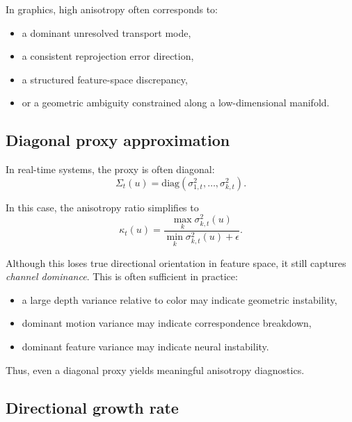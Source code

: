 \documentclass[11pt]{article}
\theoremstyle{definition}
\theoremstyle{plain}
\begin{document}
In graphics, high anisotropy often corresponds to:
\begin{itemize}[leftmargin=1.5em]
    \item a dominant unresolved transport mode,
    \item a consistent reprojection error direction,
    \item a structured feature-space discrepancy,
    \item or a geometric ambiguity constrained along a low-dimensional manifold.
\end{itemize}


\subsection{Diagonal proxy approximation}

In real-time systems, the proxy is often diagonal:
\begin{equation}
\Sigma_t(u)=\mathrm{diag}(\sigma^2_{1,t},\dots,\sigma^2_{k,t}).
\end{equation}

In this case, the anisotropy ratio simplifies to
\begin{equation}
\kappa_t(u)=\frac{\max_k \sigma^2_{k,t}(u)}{\min_k \sigma^2_{k,t}(u)+\epsilon}.
\end{equation}

Although this loses true directional orientation in feature space, it still captures \emph{channel dominance}. This is often sufficient in practice:
\begin{itemize}[leftmargin=1.5em]
    \item a large depth variance relative to color may indicate geometric instability,
    \item dominant motion variance may indicate correspondence breakdown,
    \item dominant feature variance may indicate neural instability.
\end{itemize}

Thus, even a diagonal proxy yields meaningful anisotropy diagnostics.


\subsection{Directional growth rate}
\end{document}

